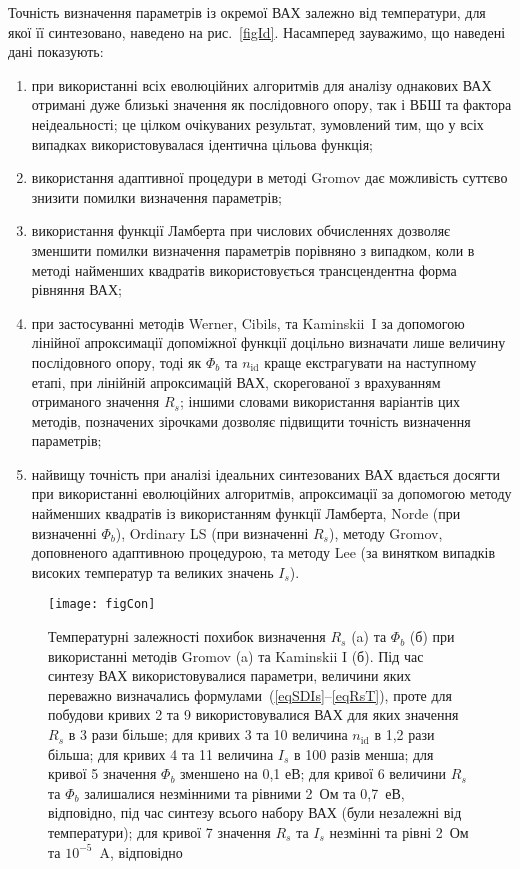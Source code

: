 Точність визначення параметрів із окремої ВАХ залежно від температури, для якої її синтезовано, наведено на рис.~\ref{figId}.
Насамперед зауважимо, що наведені дані показують:
\begin{enumerate}[label=\asbuk*),leftmargin=0em,itemindent=1.5em]
\item при використанні всіх еволюційних алгоритмів для аналізу однакових ВАХ отримані дуже близькі значення як послідовного опору, так і ВБШ та фактора неідеальності;
це цілком очікуваних результат, зумовлений тим, що у всіх випадках використовувалася ідентична цільова функція;
\item використання адаптивної процедури в методі Gromov дає можливість суттєво знизити помилки визначення параметрів;
\item використання функції Ламберта при числових обчисленнях дозволяє зменшити помилки визначення параметрів порівняно з випадком, коли в методі найменших квадратів використовується трансцендентна форма рівняння ВАХ;
\item при застосуванні методів Werner, Cibils, та Kaminskii~I за допомогою лінійної апроксимації допоміжної функції доцільно визначати лише величину послідовного опору,
тоді як $\Phi_b$ та $n_\mathrm{id}$ краще екстрагувати на наступному етапі, при лінійній апроксимацій ВАХ, скорегованої з врахуванням  отриманого значення $R_s$;
іншими словами використання варіантів цих методів, позначених зірочками дозволяє підвищити точність визначення параметрів;
\item найвищу точність при аналізі ідеальних синтезованих ВАХ вдається досягти при використанні еволюційних алгоритмів, апроксимації за допомогою методу найменших квадратів із використанням функції Ламберта, Norde (при визначенні $\Phi_b$), Ordinary LS (при визначенні $R_s$), методу Gromov, доповненого адаптивною процедурою, та методу Lee (за винятком випадків високих температур та великих значень $I_s$).
\end{enumerate}




\begin{figure}
\center
\texttt{[image: figCon]}%
\caption{\label{figCon}
Температурні залежності похибок визначення $R_s$ (a) та $\Phi_b$ (б) при використанні методів Gromov (a) та  Kaminskii I (б).
Під час синтезу ВАХ використовувалися параметри, величини яких переважно визначались формулами~(\ref{eqSDIs}--\ref{eqRsT}),
проте для  побудови кривих 2 та 9 використовувалися ВАХ для яких значення $R_s$ в 3 рази більше;
для кривих 3 та 10 величина $n_\mathrm{id}$  в 1,2 рази більша;
для кривих 4 та 11 величина $I_s$  в 100 разів менша;
для кривої 5 значення $\Phi_b$  зменшено на 0,1 еВ;
для кривої 6 величини $R_s$ та $\Phi_b$ залишалися незмінними та рівними 2~Ом та 0,7~еВ, відповідно, під час синтезу всього
набору ВАХ (були незалежні від температури);
для кривої 7 значення $R_s$ та $I_s$ незмінні та рівні 2~Ом та $10^{-5}$~A, відповідно
}
\end{figure}

